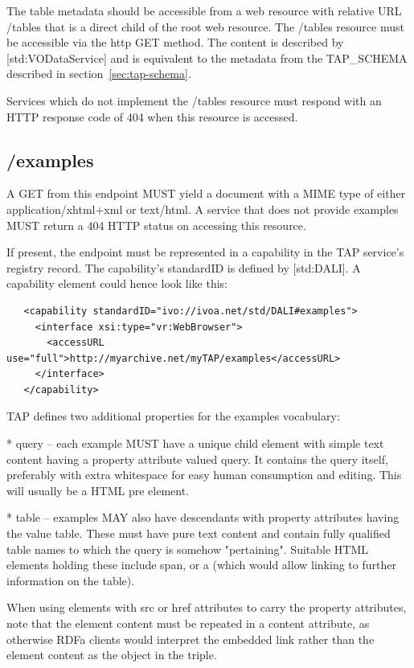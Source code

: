 \documentclass[11pt,letter]{ivoa}
\begin{document}
The table metadata should be accessible from a web resource with relative URL 
/tables that is a direct child of the root web resource. The /tables resource 
must be accessible via the http GET method. The content is described by 
[std:VODataService] and is equivalent to the metadata from the 
TAP\_SCHEMA described in section~\ref{sec:tap-schema}.

Services which do not implement the /tables resource must respond with an HTTP 
response code of 404 when this resource is accessed.

\subsection{/examples}
\label{sec:dali-examples}

A GET from this endpoint MUST yield a document with a MIME type of either 
application/xhtml+xml or text/html. A service that does not provide examples 
MUST return a 404 HTTP status on accessing this resource.

If present, the endpoint must be represented in a capability in the TAP 
service's registry record. The capability's standardID is defined by 
[std:DALI]. A capability element could hence look like this:

\begin{verbatim}
   <capability standardID="ivo://ivoa.net/std/DALI#examples">
     <interface xsi:type="vr:WebBrowser">
       <accessURL use="full">http://myarchive.net/myTAP/examples</accessURL>
     </interface>
   </capability>
\end{verbatim}

TAP defines two additional properties for the examples vocabulary:

* query -- each example MUST have a unique child element with simple text 
content having a property attribute valued query. It contains the query itself, 
preferably with extra whitespace for easy human consumption and editing. This 
will usually be a HTML pre element.
    
* table -- examples MAY also have descendants with property attributes having 
the value table. These must have pure text content and contain fully qualified 
table names to which the query is somehow "pertaining". Suitable HTML elements 
holding these include span, or a (which would allow linking to further 
information on the table).

When using elements with src or href attributes to carry the property 
attributes, note that the element content must be repeated in a content 
attribute, as otherwise RDFa clients would interpret the embedded link rather 
than the element content as the object in the triple.
\end{document}
